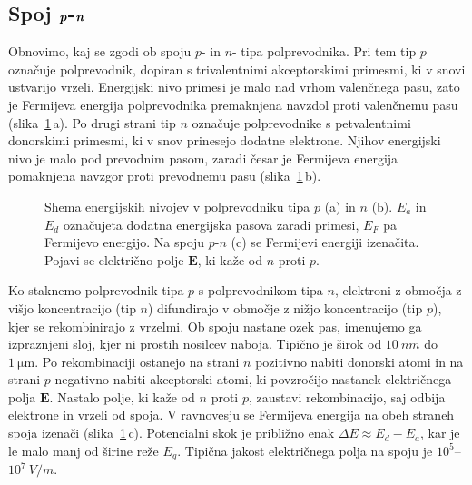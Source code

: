 \subsection*{Spoj $\textbf{\textit{p}}$-$\textbf{\textit{n}}$}
Obnovimo, kaj se zgodi ob spoju $p$- in $n$- tipa polprevodnika. Pri tem tip $p$ označuje
polprevodnik, dopiran s trivalentnimi akceptorskimi primesmi, ki v snovi ustvarijo vrzeli.
Energijski nivo primesi je malo nad vrhom valenčnega pasu, zato je Fermijeva energija
polprevodnika premaknjena navzdol proti valenčnemu pasu (slika~\ref{11_PN1}\,a). 
Po drugi strani tip $n$ označuje polprevodnike s petvalentnimi 
donorskimi primesmi, ki v snov prinesejo dodatne elektrone. Njihov energijski nivo je malo 
pod prevodnim pasom, zaradi česar je Fermijeva energija pomaknjena navzgor proti prevodnemu pasu
(slika~\ref{11_PN1}\,b).
\begin{figure}[h]
\centering
\def\svgwidth{140truemm} 

\caption{Shema energijskih nivojev v polprevodniku tipa $p$ (a) in $n$ (b). 
$E_a$ in $E_d$ označujeta dodatna energijska pasova zaradi primesi, 
$E_F$ pa Fermijevo energijo. Na spoju $p$-$n$ (c) se Fermijevi energiji izenačita.
Pojavi se električno polje $\mathbf{E}$, ki kaže od $n$ proti $p$.}
\label{11_PN1}
\end{figure}

Ko staknemo polprevodnik tipa $p$ s polprevodnikom tipa $n$, elektroni 
z območja z višjo koncentracijo (tip $n$) difundirajo v območje z nižjo koncentracijo
(tip $p$), kjer se rekombinirajo z vrzelmi. 
Ob spoju nastane ozek pas, imenujemo ga izpraznjeni sloj, kjer ni  
prostih nosilcev naboja. Tipično je širok od $10~\si{nm}$ do $1~\si{\micro\metre}$.
Po rekombinaciji ostanejo na strani $n$ pozitivno nabiti donorski atomi in 
na strani $p$ negativno nabiti akceptorski atomi, ki povzročijo nastanek  
električnega polja $\mathbf{E}$. Nastalo polje, ki kaže od $n$ proti $p$, zaustavi rekombinacijo, saj odbija
elektrone in vrzeli od spoja. V ravnovesju se Fermijeva energija na obeh straneh spoja 
izenači (slika~\ref{11_PN1}\,c). 
Potencialni skok je približno enak $\Delta E \approx E_d-E_a$, kar je le malo manj od 
širine reže $E_g$. Tipična jakost električnega polja na spoju je $10^5$--$10^7~\si{V/m}$.

